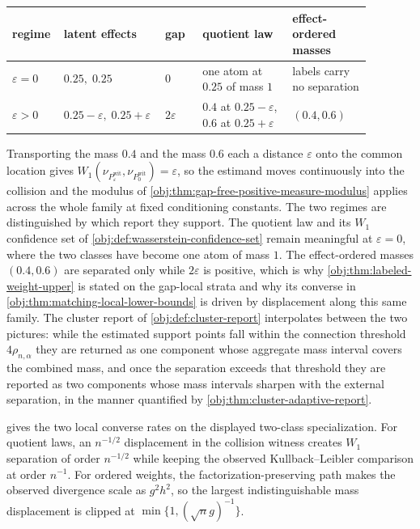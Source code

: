 \documentclass[11pt]{article}
\begin{document}
\begin{center}
\small
\begin{tabular}{p{0.13\linewidth}p{0.20\linewidth}p{0.10\linewidth}p{0.24\linewidth}p{0.21\linewidth}}
regime & latent effects & gap & quotient law & effect-ordered masses\\
\hline
\(\varepsilon=0\) & \(0.25,\;0.25\) & \(0\) & one atom at \(0.25\) of mass \(1\) & labels carry no separation\\
\(\varepsilon>0\) & \(0.25-\varepsilon,\;0.25+\varepsilon\) & \(2\varepsilon\) & \(0.4\) at \(0.25-\varepsilon\), \(0.6\) at \(0.25+\varepsilon\) & \((0.4,0.6)\)\\
\end{tabular}
\end{center}

Transporting the mass \(0.4\) and the mass \(0.6\) each a distance \(\varepsilon\) onto the common location gives \(W_1(\nu_{P^{\mathrm{wit}}_{\varepsilon}},\nu_{P^{\mathrm{wit}}_{0}})=\varepsilon\), so the estimand moves continuously into the collision and the modulus of \cref{obj:thm:gap-free-positive-measure-modulus} applies across the whole family at fixed conditioning constants. The two regimes are distinguished by which report they support. The quotient law and its \(W_1\) confidence set of \cref{obj:def:wasserstein-confidence-set} remain meaningful at \(\varepsilon=0\), where the two classes have become one atom of mass \(1\). The effect-ordered masses \((0.4,0.6)\) are separated only while \(2\varepsilon\) is positive, which is why \cref{obj:thm:labeled-weight-upper} is stated on the gap-local strata and why its converse in \cref{obj:thm:matching-local-lower-bounds} is driven by displacement along this same family. The cluster report of \cref{obj:def:cluster-report} interpolates between the two pictures: while the estimated support points fall within the connection threshold \(4\rho_{n,\alpha}\) they are returned as one component whose aggregate mass interval covers the combined mass, and once the separation exceeds that threshold they are reported as two components whose mass intervals sharpen with the external separation, in the manner quantified by \cref{obj:thm:cluster-adaptive-report}.


 gives the two local converse rates on the displayed two-class specialization. For quotient laws, an \(n^{-1/2}\) displacement in the collision witness creates \(W_1\) separation of order \(n^{-1/2}\) while keeping the observed Kullback--Leibler comparison at order \(n^{-1}\). For ordered weights, the factorization-preserving path makes the observed divergence scale as \(g^2h^2\), so the largest indistinguishable mass displacement is clipped at \(\min\{1,(\sqrt n g)^{-1}\}\).
\end{document}
